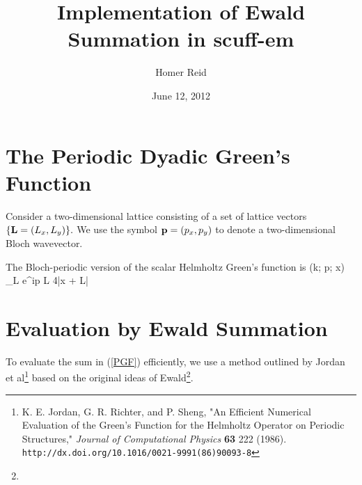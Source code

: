 \documentclass[letterpaper]{article}
\title {Implementation of Ewald Summation in {\sc scuff-em}}
\author {Homer Reid}
\date {June 12, 2012}
\newcommand{\GB}{\overline{G}}
\begin{document}
\pagestyle{myheadings}
\maketitle

\tableofcontents

\newpage

\section{The Periodic Dyadic Green's Function}

Consider a two-dimensional lattice consisting of a set of 
lattice vectors $\{\mathbf{L}=(L_x, L_y)\}.$
We use the symbol $\mathbf{p}=(p_x, p_y)$ to denote a two-dimensional
Bloch wavevector.

The Bloch-periodic version of the scalar Helmholtz Green's function is
{ \GB(k; \vb p; \vb x) 
  \equiv 
  \sum_{\vb L} e^{i\vb p \cdot \vb L} 
                    { 4\pi|\vb x + \vb L|}
}

\section{Evaluation by Ewald Summation}
To evaluate the sum in (\ref{PGF}) efficiently, we use a method 
outlined by Jordan et al\footnote{K. E. Jordan, G. R. Richter, 
and P. Sheng, "An Efficient Numerical Evaluation of the Green's 
Function for the Helmholtz Operator on Periodic Structures," 
\textit{Journal of Computational Physics} \textbf{63} 222 (1986).
\texttt{http://dx.doi.org/10.1016/0021-9991(86)90093-8}}
based on the original ideas of Ewald\footnote{}.
\end{document}
